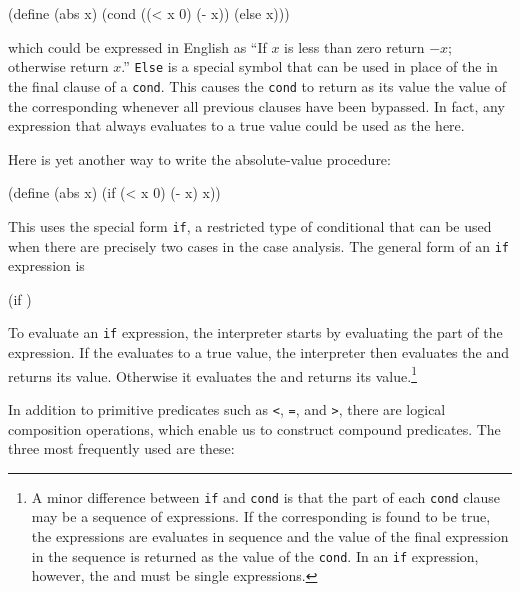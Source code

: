 \begin{schemedisplay}
\begin{schemedisplay}
(define (abs x)
  (cond ((< x 0) (- x))
        (else x)))
\end{schemedisplay}

\noindent which could be expressed in English as ``If $x$ is less than
zero return $-x$; otherwise return $x$.''  \texttt{Else} is a special
symbol that can be used in place of the  in the final clause
of a \texttt{cond}.  This causes the \texttt{cond} to return as its
value the value of the corresponding  whenever all previous
clauses have been bypassed.  In fact, any expression that always
evaluates to a true value could be used as the  here.

Here is yet another way to write the absolute-value procedure:

\begin{schemedisplay}
(define (abs x)
  (if (< x 0)
      (- x)
      x))
\end{schemedisplay}

This uses the special form \texttt{if}, a restricted type of conditional
that can be used when there are precisely two cases in the case
analysis.  The general form of an \texttt{if} expression is

\begin{schemedisplay}
(if   )
\end{schemedisplay}

To evaluate an \texttt{if} expression, the interpreter starts by
evaluating the  part of the expression.  If the
 evaluates to a true value, the interpreter then
evaluates the  and returns its value.  Otherwise it
evaluates the  and returns its value.\footnote{A
  minor difference between \texttt{if} and \texttt{cond} is that the
   part of each \texttt{cond} clause may be a sequence of
  expressions. If the corresponding  is found to be true, the
  expressions  are evaluates in sequence and the value of the
  final expression in the sequence is returned as the value of the
  \texttt{cond}. In an \texttt{if} expression, however, the
   and  must be single
  expressions.}

In addition to primitive predicates such as \texttt{<}, \texttt{=},
and \texttt{>}, there are logical composition operations, which enable
us to construct compound predicates.  The three most frequently used
are these:


\end{schemedisplay}
